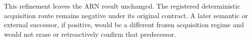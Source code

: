 This refinement leaves the ARN result unchanged.  The registered deterministic
acquisition route remains negative under its original contract.  A later semantic or
external successor, if positive, would be a different frozen acquisition regime and
would not erase or retroactively confirm that predecessor.
